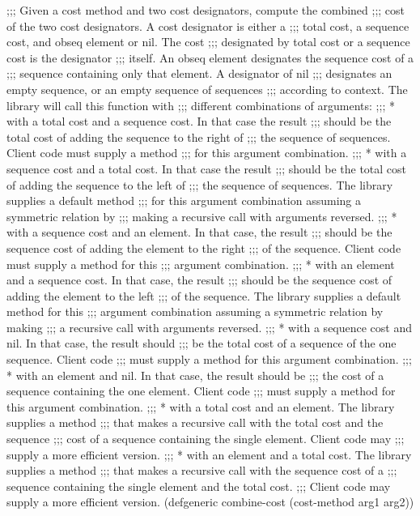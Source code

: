 ;;; Given a cost method and two cost designators, compute the combined
;;; cost of the two cost designators.  A cost designator is either a
;;; total cost, a sequence cost, and obseq element or nil.  The cost
;;; designated by total cost or a sequence cost is the designator
;;; itself.  An obseq element designates the sequence cost of a
;;; sequence containing only that element. A designator of nil
;;; designates an empty sequence, or an empty sequence of sequences
;;; according to context.  The library will call this function with
;;; different combinations of arguments:
;;; *  with a total cost and a sequence cost.  In that case the result
;;;    should be the total cost of adding the sequence to the right of
;;;    the sequence of sequences.  Client code must supply a method
;;;    for this argument combination. 
;;; *  with a sequence cost and a total cost.  In that case the result
;;;    should be the total cost of adding the sequence to the left of
;;;    the sequence of sequences.  The library supplies a default method
;;;    for this argument combination assuming a symmetric relation by 
;;;    making a recursive call with arguments reversed. 
;;; *  with a sequence cost and an element.  In that case, the result
;;;    should be the sequence cost of adding the element to the right
;;;    of the sequence.  Client code must supply a method for this
;;;    argument combination.
;;; *  with an element and a sequence cost.  In that case, the result
;;;    should be the sequence cost of adding the element to the left
;;;    of the sequence. The library supplies a default method for this
;;;    argument combination assuming a symmetric relation by making
;;;    a recursive call with arguments reversed. 
;;; *  with a sequence cost and nil.  In that case, the result should
;;;    be the total cost of a sequence of the one sequence.  Client code 
;;;    must supply a method for this argument combination. 
;;; *  with an element and nil.  In that case, the result should be
;;;    the cost of a sequence containing the one element.  Client code
;;;    must supply a method for this argument combination.
;;; *  with a total cost and an element.  The library supplies a method
;;;    that makes a recursive call with the total cost and the sequence 
;;;    cost of a sequence containing the single element.  Client code may 
;;;    supply a more efficient version.
;;; *  with an element and a total cost.  The library supplies a method
;;;    that makes a recursive call with the sequence cost of a
;;;    sequence containing the single element and the total cost.
;;;    Client code may supply a more efficient version.
(defgeneric combine-cost (cost-method arg1 arg2))

